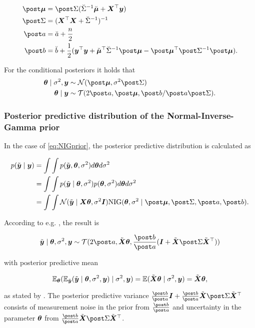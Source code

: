 \begin{equation*}
    \begin{aligned}
        \mupo &= \Sdpo (\Sdipri \mupri + \bX^\top \by) \\
        \Sdpo &= (\bX^\top \bX + \Sdipri)^{-1} \\
        \apo &= \apri + \frac{n}{2}\\
        \bpo &= \bpri + \frac{1}{2} ( \by^\top \by + \mupri^\top \Sdipri \mupo - \mupo^\top \Sdipo \mupo).
    \end{aligned}
\end{equation*}

For the conditional posteriors it holds that
\begin{equation*}
    \begin{aligned}
        \btheta \mid \ssd, \by &\sim \Ncal(\mupo, \ssd \Sdpo) \\
        \btheta \mid \by &\sim \Tcal(2 \apo, \mupo, \bpo / \apo \Sdpo).
    \end{aligned}
\end{equation*}

\subsubsection*{Posterior predictive distribution of the Normal-Inverse-Gamma prior}

In the case of \eqref{eq:NIGprior}, the posterior predictive distribution is calculated as 

\begin{equation*}
    \begin{aligned}
        p(\ty \mid \by) 
        &= \int \int p(\ty, \btheta, \ssd) d \btheta d \ssd \\
        &= \int \int p(\ty \mid \btheta, \ssd) p(\btheta, \ssd) d \btheta d \ssd \\
        &= \int \int \Ncal(\ty \mid \bX \btheta, \ssd \bI) \text{NIG}(\btheta, \ssd \mid \mupo, \Sdpo, \apo, \bpo).
    \end{aligned}
\end{equation*}

According to e.g. \citet{murphy_conjugate_nodate}, the result is

\begin{equation*}
    \ty \mid \btheta, \ssd, \by \sim \Tcal(2 \apo, \tX \btheta, \frac{\bpo}{\apo} (\bI + \tX \Sdpo \tX^\top))
\end{equation*}

with posterior predictive mean

\begin{equation*}
    \mathbb{E}_{\bm{\theta}} ( \mathbb{E}_{\tilde{\bm{y}}} (\tilde{\bm{y}} \mid \bm{\theta}, \sigma^2, \bm{y}) \mid \sigma^2, \bm{y} ) = \mathbb{E} (\tilde{\bm{X}} \bm{\theta} \mid \sigma^2 , \bm{y}) = \tilde{\bm{X}} \bm{\theta},
\end{equation*}

as stated by \citet{gelman_bayesian_2013}. The posterior predictive variance $\frac{\bpo}{\apo} \bI + \frac{\bpo}{\apo} \tX \Sdpo \tX^\top$ consists of measurement noise in the prior from $\frac{\bpo}{\apo}$ and uncertainty in the parameter $\bm{\theta}$ from $\frac{\bpo}{\apo} \tX \Sdpo \tX^\top$. 